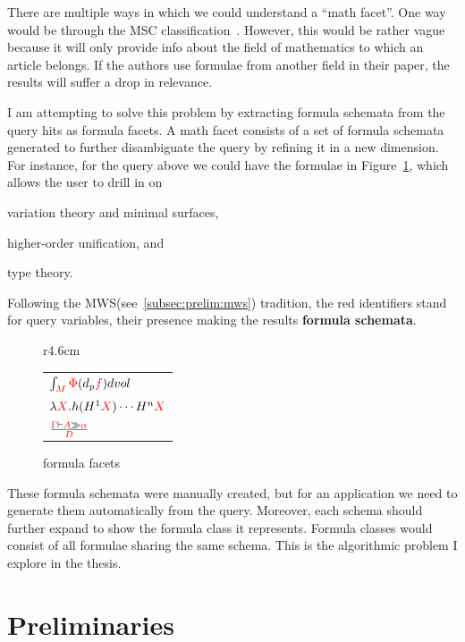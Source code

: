 \documentclass[a4paper,11pt,oneside]{article}
\def\red#1{\textcolor{red}{#1}}
\def\MWS{\textsf{MWS}\xspace}
\begin{document}
There are multiple ways in which we could understand a ``math facet''.  One way
would be through the MSC classification~\cite{MSC-SKOS}.  However, this would
be rather vague because it will only provide info about the field of
mathematics to which an article belongs. If the authors use formulae from
another field in their paper, the results will suffer a drop in relevance.

I am attempting to solve this problem by extracting formula schemata from the
query hits as formula facets. A math facet consists of a set of formula
schemata generated to further disambiguate the query by refining it in a new
dimension.  For instance, for the query above we could have the formulae in
Figure~\ref{fig:formula-facets}, which allows the user to drill in on
\begin{inparaenum}[\em i\rm)]
\item variation theory and minimal surfaces,
\item higher-order unification, and 
\item type theory.
\end{inparaenum}
Following the \MWS (see~\ref{subsec:prelim:mws}) tradition, the red identifiers
stand for query variables, their presence making the results \textbf{formula
schemata}.

\begin{figure}r{4.6cm}\vspace*{-1em}
\begin{tabular}{l}
$\int_{\red{M}}{\red\Phi(d_p\red{f}) dvol}$\\[1ex]
$\lambda{\red{X}}.h(H^1\red{X})\cdots{H^n\red{X}}$\\[1ex]
$\frac{\red\Gamma\vdash\red{A}\gg\red\alpha}{\red{D}}$
\end{tabular}\vspace*{-.5em}
\caption{formula facets}\label{fig:formula-facets}\vspace*{-1em}
\end{figure}

These formula schemata were manually created, but for an application we need to
generate them automatically from the query. Moreover, each schema should
further expand to show the formula class it represents. Formula classes would
consist of all formulae sharing the same schema. This is the algorithmic
problem I explore in the thesis. 


\section{Preliminaries}\label{sec:prelim}
\end{document}
